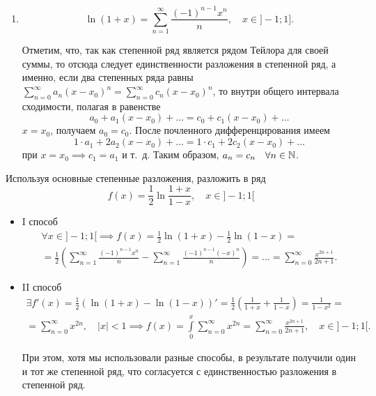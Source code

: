 \documentclass[../../main.tex]{subfiles}
\begin{document}
\begin{enumerate}
        \item \[\ln(1 + x) = \sum\limits_{n = 1}^{\infty}\frac{(-1)^{n - 1}x^n}
        {n}, \quad x \in ]-1; 1].\]
        
        Отметим, что, так как степенной ряд является рядом Тейлора для своей 
        суммы, то отсюда следует единственности разложения в степенной ряд, а 
        именно, если два степенных ряда равны $\sum\limits_{n = 0}^{\infty} 
        a_n(x - x_0)^n = \sum\limits_{n = 0}^{\infty} c_n(x-x_0)^n$, то внутри 
        общего интервала сходимости, полагая в равенстве
        \[ a_0 + a_1(x - x_0) + \ldots = c_0 + c_1(x - x_0) + \ldots \]
        $x = x_0$, получаем $a_0 = c_0$. После почленного дифференцирования
        имеем\[1 \cdot a_1 + 2a_2(x - x_0) + \ldots = 
        1 \cdot c_1 + 2c_2(x - x_0) + \ldots \]
        при $x = x_0 \implies c_1 = a_1$ и т.~д. Таким образом, 
        $a_n = c_n \quad \forall n \in \mathbb{N}$. 
    \end{enumerate}
    
    \begin{example}
        Используя основные степенные разложения, разложить в ряд
        \[f(x) = \frac12\ln\frac{1+x}{1-x},\quad x \in ]-1; 1[ \]
        \begin{itemize}
            \item I способ
            \begin{multline*}
                \forall x \in ]-1; 1[ \implies f(x) = \frac12 \ln(1+x) - 
                \frac12 
                \ln(1-x) = \\ = \frac12 \left(\sum\limits_{n = 1}^{\infty} 
                \frac{(-1)^{n-1}x^n}{n} - \sum\limits_{n = 1}^{\infty} 
                \frac{(-1)^{n - 1}(-x)^n}{n}\right) = \ldots = 
                \sum\limits_{n = 0}^{\infty}
                \frac{x^{2n+1}}{2n+1}.
            \end{multline*}
            
            \item II способ
            \begin{multline*}
                \exists f'(x) = \frac12 (\ln(1+x) - \ln(1-x))' = \frac12 
                \left(\frac{1}{1+x} + \frac{1}{1-x} \right) = \frac{1}{1-x^2}
                = \\ = \sum\limits_{n = 0}^{\infty} x^{2n}, \quad |x| < 1 
                \implies f(x) = \int\limits_{0}^{x} 
                \sum\limits_{n = 0}^{\infty} x^{2n} = 
                \sum\limits_{n = 0}^{\infty} \frac{x^{2n + 1}}{2n + 1}, 
                \quad x \in ]-1;1[.
            \end{multline*}
            
            При этом, хотя мы использовали разные способы, в результате 
            получили один и тот же степенной ряд, что согласуется с 
            единственностью разложения в степенной ряд.
        \end{itemize}
    \end{example}
\end{document}
